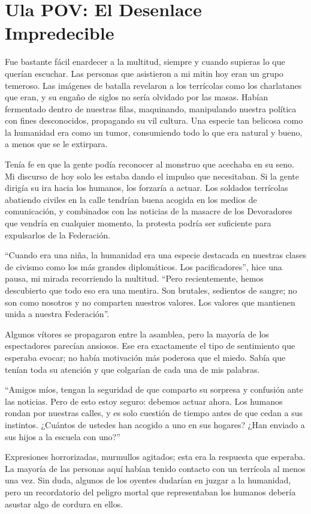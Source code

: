 \documentclass[spanish,12pt,a4paper,oneside,titlepage]{book}
\begin{document}
    \chapter{Ula POV: El Desenlace Impredecible}

    Fue bastante fácil enardecer a la multitud, siempre y cuando supieras lo que querían escuchar. Las personas que asistieron a mi mitin hoy eran un grupo temeroso. Las imágenes de batalla revelaron a los terrícolas como los charlatanes que eran, y su engaño de siglos no sería olvidado por las masas. Habían fermentado dentro de nuestras filas, maquinando, manipulando nuestra política con fines desconocidos, propagando su vil cultura. Una especie tan belicosa como la humanidad era como un tumor, consumiendo todo lo que era natural y bueno, a menos que se le extirpara.

    Tenía fe en que la gente podía reconocer al monstruo que acechaba en su seno. Mi discurso de hoy solo les estaba dando el impulso que necesitaban. Si la gente dirigía su ira hacia los humanos, los forzaría a actuar. Los soldados terrícolas abatiendo civiles en la calle tendrían buena acogida en los medios de comunicación, y combinados con las noticias de la masacre de los Devoradores que vendría en cualquier momento, la protesta podría ser suficiente para expulsarlos de la Federación.

    ``Cuando era una niña, la humanidad era una especie destacada en nuestras clases de civismo como los más grandes diplomáticos. Los pacificadores'', hice una pausa, mi mirada recorriendo la multitud. ``Pero recientemente, hemos descubierto que todo eso era una mentira. Son brutales, sedientos de sangre; no son como nosotros y no comparten nuestros valores. Los valores que mantienen unida a nuestra Federación''.

    Algunos vítores se propagaron entre la asamblea, pero la mayoría de los espectadores parecían ansiosos. Ese era exactamente el tipo de sentimiento que esperaba evocar; no había motivación más poderosa que el miedo. Sabía que tenían toda su atención y que colgarían de cada una de mis palabras.

    ``Amigos míos, tengan la seguridad de que comparto su sorpresa y confusión ante las noticias. Pero de esto estoy seguro: debemos actuar ahora. Los humanos rondan por nuestras calles, y es solo cuestión de tiempo antes de que cedan a sus instintos. ¿Cuántos de ustedes han acogido a uno en sus hogares? ¿Han enviado a sus hijos a la escuela con uno?''

    Expresiones horrorizadas, murmullos agitados; esta era la respuesta que esperaba. La mayoría de las personas aquí habían tenido contacto con un terrícola al menos una vez. Sin duda, algunos de los oyentes dudarían en juzgar a la humanidad, pero un recordatorio del peligro mortal que representaban los humanos debería asustar algo de cordura en ellos.
\end{document}
